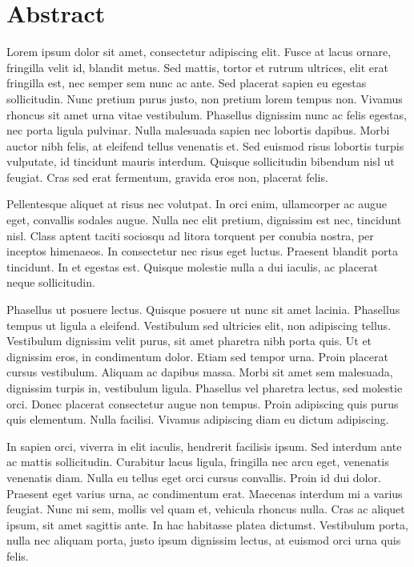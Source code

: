 \section*{Abstract}

\vspace{30pt}

Lorem ipsum dolor sit amet, consectetur adipiscing elit. Fusce at lacus ornare, fringilla velit id, blandit metus. Sed mattis, tortor et rutrum ultrices, elit erat fringilla est, nec semper sem nunc ac ante. Sed placerat sapien eu egestas sollicitudin. Nunc pretium purus justo, non pretium lorem tempus non. Vivamus rhoncus sit amet urna vitae vestibulum. Phasellus dignissim nunc ac felis egestas, nec porta ligula pulvinar. Nulla malesuada sapien nec lobortis dapibus. Morbi auctor nibh felis, at eleifend tellus venenatis et. Sed euismod risus lobortis turpis vulputate, id tincidunt mauris interdum. Quisque sollicitudin bibendum nisl ut feugiat. Cras sed erat fermentum, gravida eros non, placerat felis.

Pellentesque aliquet at risus nec volutpat. In orci enim, ullamcorper ac augue eget, convallis sodales augue. Nulla nec elit pretium, dignissim est nec, tincidunt nisl. Class aptent taciti sociosqu ad litora torquent per conubia nostra, per inceptos himenaeos. In consectetur nec risus eget luctus. Praesent blandit porta tincidunt. In et egestas est. Quisque molestie nulla a dui iaculis, ac placerat neque sollicitudin.

Phasellus ut posuere lectus. Quisque posuere ut nunc sit amet lacinia. Phasellus tempus ut ligula a eleifend. Vestibulum sed ultricies elit, non adipiscing tellus. Vestibulum dignissim velit purus, sit amet pharetra nibh porta quis. Ut et dignissim eros, in condimentum dolor. Etiam sed tempor urna. Proin placerat cursus vestibulum. Aliquam ac dapibus massa. Morbi sit amet sem malesuada, dignissim turpis in, vestibulum ligula. Phasellus vel pharetra lectus, sed molestie orci. Donec placerat consectetur augue non tempus. Proin adipiscing quis purus quis elementum. Nulla facilisi. Vivamus adipiscing diam eu dictum adipiscing.

In sapien orci, viverra in elit iaculis, hendrerit facilisis ipsum. Sed interdum ante ac mattis sollicitudin. Curabitur lacus ligula, fringilla nec arcu eget, venenatis venenatis diam. Nulla eu tellus eget orci cursus convallis. Proin id dui dolor. Praesent eget varius urna, ac condimentum erat. Maecenas interdum mi a varius feugiat. Nunc mi sem, mollis vel quam et, vehicula rhoncus nulla. Cras ac aliquet ipsum, sit amet sagittis ante. In hac habitasse platea dictumst. Vestibulum porta, nulla nec aliquam porta, justo ipsum dignissim lectus, at euismod orci urna quis felis.

